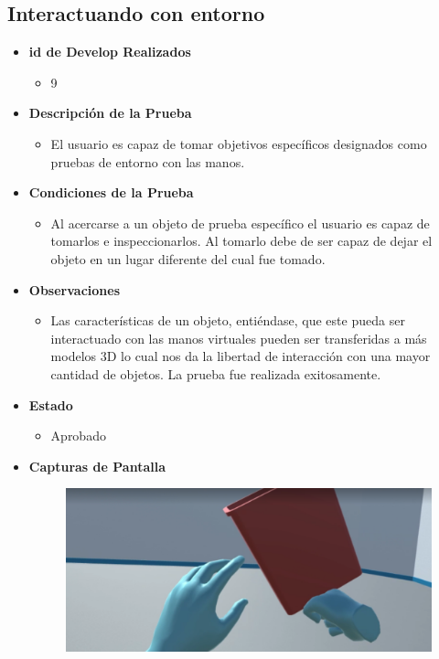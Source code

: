 \subsection{Interactuando con entorno}
\begin{itemize}
    \item \textbf{id de Develop Realizados}
    \begin{itemize}
        \item 9
    \end{itemize}
    \item \textbf{Descripción de la Prueba}
    \begin{itemize}
        \item El usuario es capaz de tomar objetivos específicos designados como pruebas de entorno con las manos.
    \end{itemize}
    \item \textbf{Condiciones de la Prueba}
    \begin{itemize}
        \item Al acercarse a un objeto de prueba específico el usuario es capaz de tomarlos e inspeccionarlos.  Al tomarlo debe de ser capaz de dejar el objeto en un lugar diferente del cual fue tomado.
    \end{itemize}
    \item \textbf{Observaciones}
    \begin{itemize}
        \item Las características de un objeto, entiéndase, que este pueda ser interactuado con las manos virtuales pueden ser transferidas a más modelos 3D lo cual nos da la libertad de interacción con una mayor cantidad de objetos.
        La prueba fue realizada exitosamente.      
    \end{itemize}
    \item \textbf{Estado}
    \begin{itemize}
        \item Aprobado
    \end{itemize}
    \item \textbf{Capturas de Pantalla}
    \begin{figure}[H]
       	\begin{center}
       		\includegraphics[width = .7\textwidth]{source/images/image11.png}

\end{center}
\end{figure}
\end{itemize}
